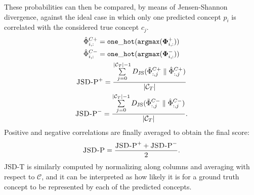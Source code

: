 These probabilities can then be compared, by means of Jensen-Shannon divergence, against the ideal case in which only one predicted concept $p_i$ is correlated with the considered true concept $c_j$.
\begin{gather*}
	\hat\Phi^{C+}_{i,:} = \mathtt{one\_hot}(\mathtt{argmax}
	(\mathbf{\Phi}^{+}_{i,:}))\\
	\hat\Phi^{C-}_{i,:} = \mathtt{one\_hot}(\mathtt{argmax}(\mathbf{\Phi}^{-}_{i,:}))\\
	\textsc{JSD-P}^{+} = \frac{\sum\limits_{j = 0}^{|{\mathcal{C}}_T|-1} D_\mathrm{JS}(\tilde{\Phi}^{C+}_{:, j} \parallel \hat\Phi^{C+}_{:, j})}{|{\mathcal{C}}_T|}\\
	\textsc{JSD-P}^{-} = \frac{\sum\limits_{j = 0}^{|{\mathcal{C}}_T|-1} D_\mathrm{JS}(\tilde{\Phi}^{C-}_{:, j} \parallel \hat\Phi^{C-}_{:, j})}{|{\mathcal{C}}_T|}.
\end{gather*}
Positive and negative correlations are finally averaged to obtain the final score:
$$
\textsc{JSD-P} = \frac{\textsc{JSD-P}^{+} + \textsc{JSD-P}^{-}}{2}.
$$
\textsc{JSD-T} is similarly computed by normalizing along columns and averaging with respect to $\mathcal{C}$, and it can be interpreted as how likely it is for a ground truth concept to be represented by each of the predicted concepts.